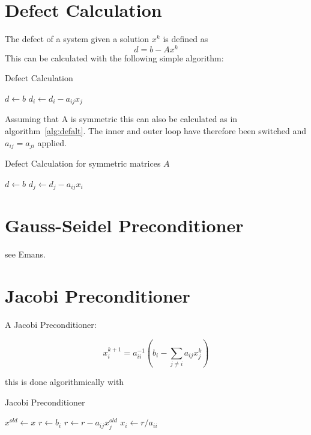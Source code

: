 \documentclass{article}
\begin{document}
\section{Defect Calculation}

The defect of a system given a solution $x^k$ is defined as 
\begin{equation}
d=b-Ax^k
\end{equation}
This can be calculated with the following simple algorithm:
\begin{algorithm}
\caption{Defect Calculation}
\label{alg:def}
\begin{algorithmic}[1]
\State $d\gets b$
    \State $d_i\gets d_i-a_{ij}x_j$ \label{line:crux}
  \EndFor
\EndFor
\end{algorithmic}
\end{algorithm}

Assuming that A is symmetric this can also be calculated as in algorithm~\ref{alg:defalt}. The inner and outer loop have therefore been switched and $a_{ij}=a_{ji}$ applied.

\begin{algorithm}
\caption{Defect Calculation for symmetric matrices $A$}
\label{alg:defalt}
\begin{algorithmic}[1]
\State $d\gets b$
    \State $d_j\gets d_j-a_{ij}x_i$ \label{line:crux2}
  \EndFor
\EndFor
\end{algorithmic}
\end{algorithm}

\section{Gauss-Seidel Preconditioner}

see Emans.

\section{Jacobi Preconditioner}

A Jacobi Preconditioner:

\begin{equation}
x_i^{k+1}=a_{ii}^{-1}\left(b_i-\sum_{j\neq i}a_{ij}x_j^k\right)
\end{equation}

this is done algorithmically with
\begin{algorithm}
\caption{Jacobi Preconditioner}
\label{alg:jac}
\begin{algorithmic}[1]
\State $x^{old}\gets x$
  \State $r\gets b_i$
    \State $r \gets r - a_{ij}x_j^{old}$
  \EndFor
  \State $x_i \gets r/a_{ii}$
\EndFor
\end{algorithmic}
\end{algorithm}
\end{document}
